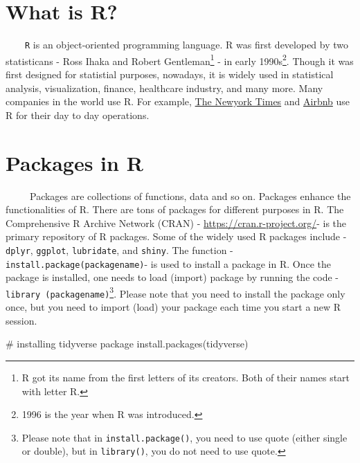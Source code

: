\documentclass[
  letterpaper,
  DIV=11,
  numbers=noendperiod]{scrreprt}
\newenvironment{Shaded}{\begin{snugshade}}{\end{snugshade}}
\newcommand{\CommentTok}[1]{\textcolor[rgb]{0.37,0.37,0.37}{#1}}
\newcommand{\FunctionTok}[1]{\textcolor[rgb]{0.28,0.35,0.67}{#1}}
\newcommand{\NormalTok}[1]{\textcolor[rgb]{0.00,0.23,0.31}{#1}}
\newcommand{\StringTok}[1]{\textcolor[rgb]{0.13,0.47,0.30}{#1}}
\begin{document}
\section{What is R?}\label{what-is-r}

~~~~\texttt{R} is an object-oriented programming language. R was first
developed by two statisticans - Ross Ihaka and Robert
Gentleman\footnote{R got its name from the first letters of its
  creators. Both of their names start with letter R.} - in early
1990s\footnote{1996 is the year when R was introduced.}. Though it was
first designed for statistial purposes, nowadays, it is widely used in
statistical analysis, visualization, finance, healthcare industry, and
many more. Many companies in the world use R. For example,
\href{https://www.nytimes.com/2009/01/07/technology/business-computing/07program.html?pagewanted=1&_r=1}{The
Newyork Times} and
\href{https://www.tandfonline.com/doi/full/10.1080/00031305.2017.1392362}{Airbnb}
use R for their day to day operations.

\section{Packages in R}\label{packages-in-r}

~~~~~Packages are collections of functions, data and so on. Packages
enhance the functionalities of R. There are tons of packages for
different purposes in R. The Comprehensive R Archive Network (CRAN) -
\url{https://cran.r-project.org/}- is the primary repository of R
packages. Some of the widely used R packages include - \texttt{dplyr},
\texttt{ggplot}, \texttt{lubridate}, and \texttt{shiny}. The function -
\texttt{install.package(\textquotesingle{}packagename\textquotesingle{})}-
is used to install a package in R. Once the package is installed, one
needs to load (import) package by running the code -
\texttt{library\ (packagename)}\footnote{Please note that in
  \texttt{install.package()}, you need to use quote (either single or
  double), but in \texttt{library()}, you do not need to use quote.}.
Please note that you need to install the package only once, but you need
to import (load) your package each time you start a new R session.

\begin{Shaded}
\begin{Highlighting}[]
\CommentTok{\# installing tidyverse package }
\FunctionTok{install.packages}\NormalTok{(}\StringTok{\textquotesingle{}tidyverse\textquotesingle{}}\NormalTok{)}
\end{Highlighting}
\end{Shaded}
\end{document}
